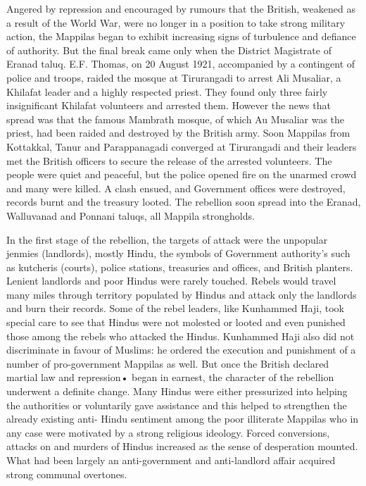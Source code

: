 \begin{multicols}{2}
Angered by repression and encouraged by rumours that the British, weakened as a result of the World War, were no longer in a position to take strong military action, the Mappilas began to exhibit increasing signs of turbulence and defiance of authority. But the final break came only when the District Magistrate of Eranad taluq. E.F. Thomas, on 20 August 1921, accompanied by a contingent of police and troops, raided the mosque at Tirurangadi to arrest Ali Musaliar, a Khilafat leader and a highly respected priest. They found only three fairly insignificant Khilafat volunteers and arrested them. However the news that spread was that the famous Mambrath mosque, of which Au Musaliar was the priest, had been raided and destroyed by the British army. Soon Mappilas from Kottakkal, Tanur and Parappanagadi converged at Tirurangadi and their leaders met the British officers to secure the release of the arrested volunteers. The people were quiet and peaceful, but the police opened fire on the unarmed crowd and many were killed. A clash ensued, and Government offices were destroyed, records burnt and the treasury looted. The rebellion soon spread into the Eranad, Walluvanad and Ponnani taluqs, all Mappila strongholds.

In the first stage of the rebellion, the targets of attack were the unpopular jenmies (landlords), mostly Hindu, the symbols of Government authority's such as kutcheris (courts), police stations, treasuries and offices, and British planters. Lenient landlords and poor Hindus were rarely touched. Rebels would travel many miles through territory populated by Hindus and attack only the landlords and burn their records. Some of the rebel leaders, like Kunhammed Haji, took special care to see that Hindus were not molested or looted and even punished those among the rebels who attacked the Hindus. Kunhammed Haji also did not discriminate in favour of Muslims: he ordered the execution and punishment of a number of pro-government Mappilas as well. But once the British declared martial law and repression• began in earnest, the character of the rebellion underwent a definite change. Many Hindus were either pressurized into helping the authorities or voluntarily gave assistance and this helped to strengthen the already existing anti- Hindu sentiment among the poor illiterate Mappilas who in any case were motivated by a strong religious ideology. Forced conversions, attacks on and murders of Hindus increased as the sense of desperation mounted. What had been largely an anti-government and anti-landlord affair acquired strong communal overtones.


\end{multicols}
